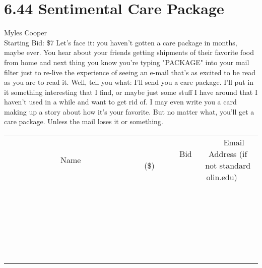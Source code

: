 \documentclass[11pt]{article}
\begin{document}
\section*{6.44 Sentimental Care Package}
Myles Cooper
\\
Starting Bid: \$7
\newline
Let's face it: you haven't gotten a care package in months, maybe ever. You hear about your friends getting shipments of their favorite food from home and next thing you know you're typing "PACKAGE" into your mail filter just to re-live the experience of seeing an e-mail that's as excited to be read as you are to read it. Well, tell you what: I'll send you a care package. I'll put in it something interesting that I find, or maybe just some stuff I have around that I haven't used in a while and want to get rid of. I may even write you a card making up a story about how it's your favorite. But no matter what, you'll get a care package. Unless the mail loses it or something.
\\[6ex]
\begin{tabular}{c c c}
~~~~~~~~~~~~~Name~~~~~~~~~~~~~ & ~~~~~~~~~Bid (\$)~~~~~~~~~  & ~~~Email Address (if not standard olin.edu)~~~\\
 & & \\
\hline
 & & \\
\hline
 & & \\
\hline
 & & \\
\hline
 & & \\
\hline
 & & \\
\hline
 & & \\
\hline
 & & \\
\hline
 & & \\
\hline
 & & \\
\hline
 & & \\
\hline
 & & \\
\hline
 & & \\
\hline
 & & \\
\hline
 & & \\
\hline
 & & \\
\hline
 & & \\
\hline
 & & \\
\hline
 & & \\
\hline
 & & \\
\hline
 & & \\
\hline
 & & \\
\hline
 & & \\
\hline
 & & \\
\hline
 & & \\
\hline
 & & \\
\hline
\end{tabular}
\newpage
\end{document}
